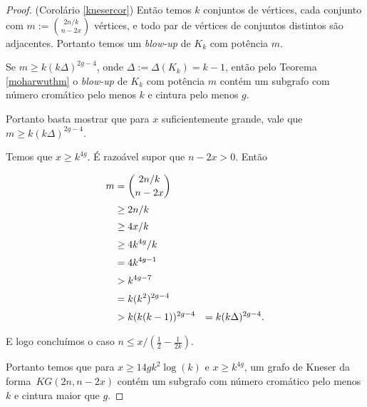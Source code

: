 \begin{proof}{(Corolário \ref{knesercor})}
Então temos $k$ conjuntos de vértices, cada conjunto com $m := \binom{2n/k}{n-2x}$ vértices, e todo par de vértices de conjuntos distintos são adjacentes. Portanto temos um \textit{blow-up} de $K_k$ com potência $m$.

Se $m \geq k(k\Delta)^{2g-4}$, onde $\Delta := \Delta(K_k) = k-1$, então pelo Teorema \ref{moharwuthm} o \textit{blow-up} de $K_k$ com potência $m$ contém um subgrafo com número cromático pelo menos $k$ e cintura pelo menos $g$.

Portanto basta mostrar que para $x$ suficientemente grande, vale que $m \geq k(k\Delta)^{2g-4}$.

Temos que $x\geq k^{4g}$. É razoável supor que $n-2x > 0$. Então

\begin{equation*}
\setlength{\jot}{5pt}
\begin{aligned}
m &= \binom{2n/k}{n-2x}\\
&\geq 2n/k\\
&\geq 4x/k\\
&\geq 4k^{4g}/k\\
&= 4k^{4g-1}\\
&> k^{4g-7}\\
&= k(k^2)^{2g-4}\\
&> k(k(k-1))^{2g-4}&= k(k\Delta)^{2g-4}.
\end{aligned}
\end{equation*}

E logo concluímos o caso $n \leq x/(\frac{1}{2} - \frac{1}{2k})$.

Portanto temos que para $x \geq 14gk^2\log(k)$ e $x\geq k^{4g}$, um grafo de Kneser da forma~$KG(2n,n-2x)$ contém um subgrafo com número cromático pelo menos $k$ e cintura maior que $g$.





\end{proof}


